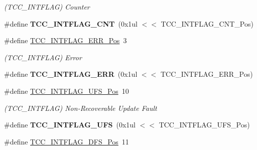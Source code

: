 \begin{DoxyCompactItemize}
\begin{DoxyCompactList}\small\item\em (T\+C\+C\+\_\+\+I\+N\+T\+F\+L\+A\+G) Counter \end{DoxyCompactList}\item 
\hypertarget{group___s_a_m_l21___t_c_c_gaab900ec6b732e15def3e1fc4c0ede0ca}{}\#define {\bfseries T\+C\+C\+\_\+\+I\+N\+T\+F\+L\+A\+G\+\_\+\+C\+N\+T}~(0x1ul $<$$<$ T\+C\+C\+\_\+\+I\+N\+T\+F\+L\+A\+G\+\_\+\+C\+N\+T\+\_\+\+Pos)\label{group___s_a_m_l21___t_c_c_gaab900ec6b732e15def3e1fc4c0ede0ca}

\item 
\hypertarget{group___s_a_m_l21___t_c_c_ga8ec7d5bec71bbc4170274d0d8a2a831a}{}\#define \hyperlink{group___s_a_m_l21___t_c_c_ga8ec7d5bec71bbc4170274d0d8a2a831a}{T\+C\+C\+\_\+\+I\+N\+T\+F\+L\+A\+G\+\_\+\+E\+R\+R\+\_\+\+Pos}~3\label{group___s_a_m_l21___t_c_c_ga8ec7d5bec71bbc4170274d0d8a2a831a}

\begin{DoxyCompactList}\small\item\em (T\+C\+C\+\_\+\+I\+N\+T\+F\+L\+A\+G) Error \end{DoxyCompactList}\item 
\hypertarget{group___s_a_m_l21___t_c_c_ga6ba2697c99038f960f3209b9e05d8279}{}\#define {\bfseries T\+C\+C\+\_\+\+I\+N\+T\+F\+L\+A\+G\+\_\+\+E\+R\+R}~(0x1ul $<$$<$ T\+C\+C\+\_\+\+I\+N\+T\+F\+L\+A\+G\+\_\+\+E\+R\+R\+\_\+\+Pos)\label{group___s_a_m_l21___t_c_c_ga6ba2697c99038f960f3209b9e05d8279}

\item 
\hypertarget{group___s_a_m_l21___t_c_c_gae4858c7678d13eff960f32f0951a9c9c}{}\#define \hyperlink{group___s_a_m_l21___t_c_c_gae4858c7678d13eff960f32f0951a9c9c}{T\+C\+C\+\_\+\+I\+N\+T\+F\+L\+A\+G\+\_\+\+U\+F\+S\+\_\+\+Pos}~10\label{group___s_a_m_l21___t_c_c_gae4858c7678d13eff960f32f0951a9c9c}

\begin{DoxyCompactList}\small\item\em (T\+C\+C\+\_\+\+I\+N\+T\+F\+L\+A\+G) Non-\/\+Recoverable Update Fault \end{DoxyCompactList}\item 
\hypertarget{group___s_a_m_l21___t_c_c_ga1333f9c1c529871e5c731885f48f0192}{}\#define {\bfseries T\+C\+C\+\_\+\+I\+N\+T\+F\+L\+A\+G\+\_\+\+U\+F\+S}~(0x1ul $<$$<$ T\+C\+C\+\_\+\+I\+N\+T\+F\+L\+A\+G\+\_\+\+U\+F\+S\+\_\+\+Pos)\label{group___s_a_m_l21___t_c_c_ga1333f9c1c529871e5c731885f48f0192}

\item 
\hypertarget{group___s_a_m_l21___t_c_c_gadb0e97b2eaf1f9abbea34376ee1e7e48}{}\#define \hyperlink{group___s_a_m_l21___t_c_c_gadb0e97b2eaf1f9abbea34376ee1e7e48}{T\+C\+C\+\_\+\+I\+N\+T\+F\+L\+A\+G\+\_\+\+D\+F\+S\+\_\+\+Pos}~11\label{group___s_a_m_l21___t_c_c_gadb0e97b2eaf1f9abbea34376ee1e7e48}


\end{DoxyCompactItemize}
